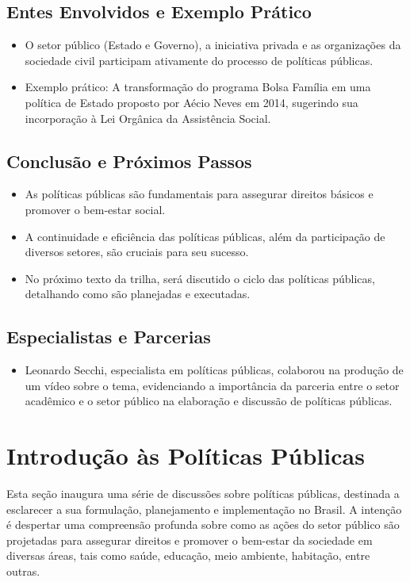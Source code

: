 \documentclass[
   article,       
   12pt,          
   oneside,       
   a4paper,       
   english,       
   brazil,        
   sumario=tradicional
   ]{abntex2}
\begin{document}
\subsection{Entes Envolvidos e Exemplo Prático}
\begin{itemize}
    \item O setor público (Estado e Governo), a iniciativa privada e as organizações da sociedade civil participam ativamente do processo de políticas públicas.
    \item Exemplo prático: A transformação do programa Bolsa Família em uma política de Estado proposto por Aécio Neves em 2014, sugerindo sua incorporação à Lei Orgânica da Assistência Social.
\end{itemize}

\subsection{Conclusão e Próximos Passos}
\begin{itemize}
    \item As políticas públicas são fundamentais para assegurar direitos básicos e promover o bem-estar social.
    \item A continuidade e eficiência das políticas públicas, além da participação de diversos setores, são cruciais para seu sucesso.
    \item No próximo texto da trilha, será discutido o ciclo das políticas públicas, detalhando como são planejadas e executadas.
\end{itemize}

\subsection{Especialistas e Parcerias}
\begin{itemize}
    \item Leonardo Secchi, especialista em políticas públicas, colaborou na produção de um vídeo sobre o tema, evidenciando a importância da parceria entre o setor acadêmico e o setor público na elaboração e discussão de políticas públicas.
\end{itemize}
\section{Introdução às Políticas Públicas}
    Esta seção inaugura uma série de discussões sobre políticas públicas, destinada a esclarecer a sua formulação, planejamento e implementação no Brasil. A intenção é despertar uma compreensão profunda sobre como as ações do setor público são projetadas para assegurar direitos e promover o bem-estar da sociedade em diversas áreas, tais como saúde, educação, meio ambiente, habitação, entre outras.
\end{document}
